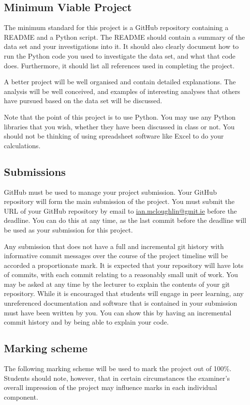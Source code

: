 \documentclass[12pt, a4paper, hidelinks]{scrartcl}
\begin{document}
\subsection*{Minimum Viable Project}
  The minimum standard for this project is a GitHub repository containing a README and a Python script.
  The README should contain a summary of the data set and your investigations into it.
  It should also clearly document how to run the Python code you used to investigate the data set, and what that code does.
  Furthermore, it should list all references used in completing the project.

  A better project will be well organised and contain detailed explanations.
  The analysis will be well conceived, and examples of interesting analyses that others have pursued based on the data set will be discussed.
  
  Note that the point of this project is to use Python.
  You may use any Python libraries that you wish, whether they have been discussed in class or not.
  You should not be thinking of using spreadsheet software like Excel to do your calculations.

\subsection*{Submissions}
  GitHub must be used to manage your project submission.
  Your GitHub repository will form the main submission of the project.
  You must submit the URL of your GitHub repository by email to \url{ian.mcloughlin@gmit.ie} before the deadline.
  You can do this at any time, as the last commit before the deadline will be used as your submission for this project.

  Any submission that does not have a full and incremental git history with informative commit messages over the course of the project timeline will be accorded a proportionate mark.
  It is expected that your repository will have lots of commits, with each commit relating to a reasonably small unit of work.
  You may be asked at any time by the lecturer to explain the contents of your git repository.
  While it is encouraged that students will engage in peer learning, any unreferenced documentation and software that is contained in your submission must have been written by you.
  You can show this by having an incremental commit history and by being able to explain your code.

\subsection*{Marking scheme}
  The following marking scheme will be used to mark the project out of 100\%.
  Students should note, however, that in certain circumstances the examiner's overall impression of the project may influence marks in each individual component.
\end{document}

